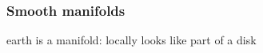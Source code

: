 \begin{frame}
  \frametitle{Smooth manifolds}
  \makebox[\textwidth]{\framebox[5cm]{
    \rule{0pt}{5cm}
  }}
  earth is a manifold: locally looks like part of a disk
\end{frame}

